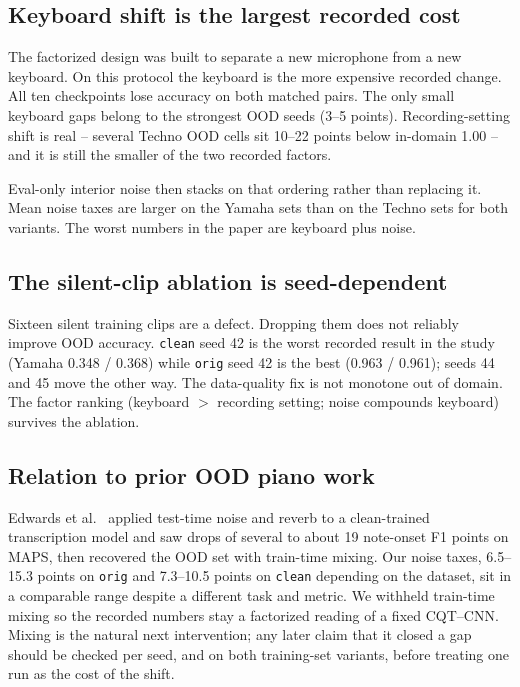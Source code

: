 \documentclass[pdflatex,sn-mathphys-num,iicol]{sn-jnl}
\theoremstyle{thmstyleone}
\theoremstyle{thmstyletwo}
\theoremstyle{thmstylethree}
\begin{document}
\subsection{Keyboard shift is the largest recorded cost}\label{subsec5_0}

The factorized design was built to separate a new microphone from a new keyboard. On this protocol the keyboard is the more expensive recorded change. All ten checkpoints lose accuracy on both matched pairs. The only small keyboard gaps belong to the strongest OOD seeds (3--5 points). Recording-setting shift is real -- several Techno OOD cells sit 10--22 points below in-domain 1.00 -- and it is still the smaller of the two recorded factors.

Eval-only interior noise then stacks on that ordering rather than replacing it. Mean noise taxes are larger on the Yamaha sets than on the Techno sets for both variants. The worst numbers in the paper are keyboard plus noise.

\subsection{The silent-clip ablation is seed-dependent}\label{subsec5_1}

Sixteen silent training clips are a defect. Dropping them does not reliably improve OOD accuracy. \texttt{clean} seed 42 is the worst recorded result in the study (Yamaha 0.348 / 0.368) while \texttt{orig} seed 42 is the best (0.963 / 0.961); seeds 44 and 45 move the other way. The data-quality fix is not monotone out of domain. The factor ranking (keyboard $>$ recording setting; noise compounds keyboard) survives the ablation.

\subsection{Relation to prior OOD piano work}\label{subsec5_2}

Edwards et al.\ \cite{Edwards2024} applied test-time noise and reverb to a clean-trained transcription model and saw drops of several to about 19 note-onset F1 points on MAPS, then recovered the OOD set with train-time mixing. Our noise taxes, 6.5--15.3 points on \texttt{orig} and 7.3--10.5 points on \texttt{clean} depending on the dataset, sit in a comparable range despite a different task and metric. We withheld train-time mixing so the recorded numbers stay a factorized reading of a fixed CQT--CNN. Mixing is the natural next intervention; any later claim that it closed a gap should be checked per seed, and on both training-set variants, before treating one run as the cost of the shift.
\end{document}
